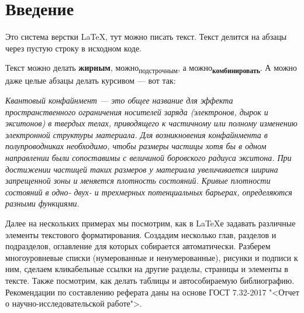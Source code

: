 \chapter*{Введение}
\thispagestyle{empty}
\label{ch:intro}

    Это система верстки \LaTeX, тут можно писать текст. Текст делится на абзацы через пустую строку в исходном коде.

    Текст можно делать \textbf{жирным}, можно\textsubscript{подстрочным}, а можно\textbf{\textsubscript{комбинировать}}. А можно даже целые абзацы делать курсивом --- вот так:

{ \itshape
    Квантовый конфайнмент --- это общее название для эффекта пространственного ограничения носителей заряда (электронов, дырок и экситонов) в твердых телах, приводящего к частичному или полному изменению электронной структуры материала. Для возникновения конфайнмента в полупроводниках необходимо, чтобы размеры частицы хотя бы в одном направлении были сопоставимы с величиной боровского радиуса экситона. При достижении частицей таких размеров у материала увеличивается ширина запрещенной зоны и меняется плотность состояний. Кривые плотности состояний в одно- двух- и трехмерных потенциальных барьерах, определяются разными функциями.
}    

    Далее на нескольких примерах мы посмотрим, как в \LaTeX{}е задавать различные элементы текстового форматирования. Создадим несколько глав, разделов и подразделов, оглавление для которых собирается автоматически. Разберем многоуровневые списки (нумерованные и ненумерованные), рисунки и подписи к ним, сделаем кликабельные ссылки на другие разделы, страницы и элементы в тексте. Также посмотрим, как делать таблицы и автособираемую библиографию. Рекомендации по составлению реферата даны на основе ГОСТ 7.32-2017 "<Отчет о научно-исследовательской работе">.

\endinput